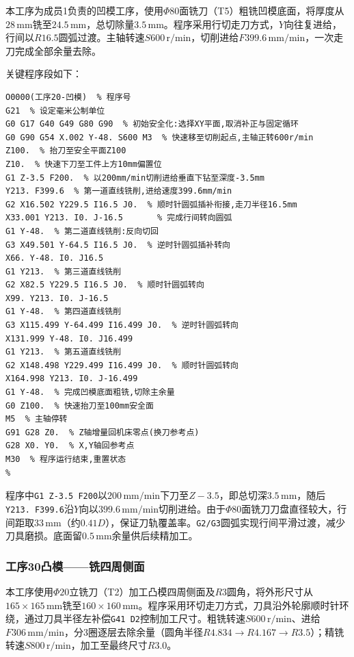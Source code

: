 \documentclass{xautCADreport}
\begin{document}
本工序为成员1负责的凹模工序，使用$\Phi80$面铣刀（T5）粗铣凹模底面，将厚度从$28\,\mathrm{mm}$铣至$24.5\,\mathrm{mm}$，总切除量$3.5\,\mathrm{mm}$。程序采用行切走刀方式，$Y$向往复进给，行间以$R16.5$圆弧过渡。主轴转速$S600\,\mathrm{r/min}$，切削进给$F399.6\,\mathrm{mm/min}$，一次走刀完成全部余量去除。

关键程序段如下：

\begin{lstlisting}[caption={工序20凹模粗铣底面程序（完整程序）}]
%
O0000(工序20-凹模)  % 程序号
G21  % 设定毫米公制单位
G0 G17 G40 G49 G80 G90  % 初始安全化:选择XY平面,取消补正与固定循环
G0 G90 G54 X.002 Y-48. S600 M3  % 快速移至切削起点,主轴正转600r/min
Z100.  % 抬刀至安全平面Z100
Z10.  % 快速下刀至工件上方10mm偏置位
G1 Z-3.5 F200.  % 以200mm/min切削进给垂直下钻至深度-3.5mm
Y213. F399.6  % 第一道直线铣削,进给速度399.6mm/min
G2 X16.502 Y229.5 I16.5 J0.  % 顺时针圆弧插补衔接,走刀半径16.5mm
X33.001 Y213. I0. J-16.5       % 完成行间转向圆弧
G1 Y-48.  % 第二道直线铣削:反向切回
G3 X49.501 Y-64.5 I16.5 J0.  % 逆时针圆弧插补转向
X66. Y-48. I0. J16.5
G1 Y213.  % 第三道直线铣削
G2 X82.5 Y229.5 I16.5 J0.  % 顺时针圆弧转向
X99. Y213. I0. J-16.5
G1 Y-48.  % 第四道直线铣削
G3 X115.499 Y-64.499 I16.499 J0.  % 逆时针圆弧转向
X131.999 Y-48. I0. J16.499
G1 Y213.  % 第五道直线铣削
G2 X148.498 Y229.499 I16.499 J0.  % 顺时针圆弧转向
X164.998 Y213. I0. J-16.499
G1 Y-48.  % 完成凹模底面粗铣,切除主余量
G0 Z100.  % 快速抬刀至100mm安全面
M5  % 主轴停转
G91 G28 Z0.  % Z轴增量回机床零点(换刀参考点)
G28 X0. Y0.  % X,Y轴回参考点
M30  % 程序运行结束,重置状态
%
\end{lstlisting}

程序中\texttt{G1 Z-3.5 F200}以$200\,\mathrm{mm/min}$下刀至$Z{-}3.5$，即总切深$3.5\,\mathrm{mm}$，随后\texttt{Y213. F399.6}沿$Y$向以$399.6\,\mathrm{mm/min}$切削进给。由于$\Phi80$面铣刀刀盘直径较大，行间距取$33\,\mathrm{mm}$（约$0.41D$），保证刀轨覆盖率。\texttt{G2/G3}圆弧实现行间平滑过渡，减少刀具磨损。底面留$0.5\,\mathrm{mm}$余量供后续精加工。

\subsubsection{工序30凸模——铣四周侧面}

本工序使用$\Phi20$立铣刀（T2）加工凸模四周侧面及$R3$圆角，将外形尺寸从$165\times165\,\mathrm{mm}$铣至$160\times160\,\mathrm{mm}$。程序采用环切走刀方式，刀具沿外轮廓顺时针环绕，通过刀具半径左补偿\texttt{G41 D2}控制加工尺寸。粗铣转速$S600\,\mathrm{r/min}$、进给$F306\,\mathrm{mm/min}$，分3圈逐层去除余量（圆角半径$R4.834\to R4.167\to R3.5$）；精铣转速$S800\,\mathrm{r/min}$，加工至最终尺寸$R3.0$。
\end{document}
